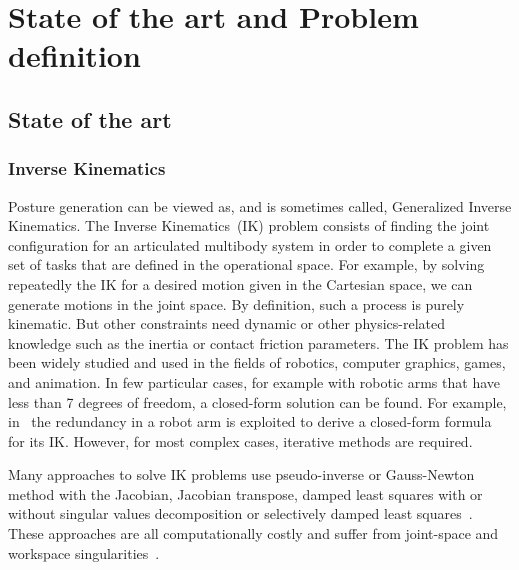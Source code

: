 
\chapter{State of the art and Problem definition}
\label{cha:state_of_the_art_and_problem_definition}

\graphicspath{{Chapter1-State-of-the-art/Figs/}}

\section{State of the art}
\label{sec:state_of_the_art}

\subsection{Inverse Kinematics}
\label{sub:inverse_kinematics}

Posture generation can be viewed as, and is sometimes called, Generalized Inverse Kinematics.
The Inverse Kinematics~(IK) problem consists of finding the joint configuration for an articulated multibody system in order to complete a given set of tasks that are defined in the operational space.
For example, by solving repeatedly the IK for a desired motion given in the Cartesian space, we can generate motions in the joint space.
By definition, such a process is purely kinematic. But other constraints need dynamic or other physics-related knowledge such as the inertia or contact friction parameters.
The IK problem has been widely studied and used in the fields of robotics, computer graphics, games, and animation.
In few particular cases, for example with robotic arms that have less than 7 degrees of freedom, a closed-form solution can be found.
For example, in~\cite{asfour2003human} the redundancy in a robot arm is exploited to derive a closed-form formula for its IK.
However, for most complex cases, iterative methods are required.


Many approaches to solve IK problems use pseudo-inverse or Gauss-Newton method with the Jacobian, Jacobian transpose, damped least squares with or without singular values decomposition or selectively damped least squares~\cite{balestrino1984robust, tolani2000real, baillieul1985kinematic, wampler1986manipulator, nakamura1986inverse, buss2005selectively}.
These approaches are all computationally costly and suffer from joint-space and workspace singularities~\cite{aristidou2009inverse}.

